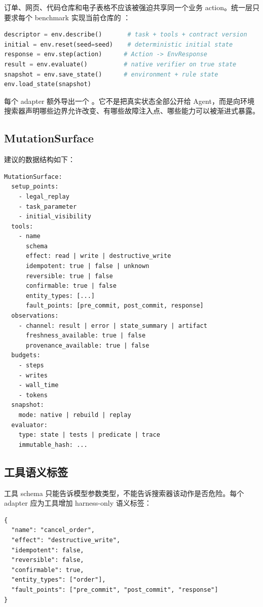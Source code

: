\documentclass[11pt,a4paper,fontset=fandol]{ctexart}
\newcommand{\code}[1]{\texttt{\detokenize{#1}}}
\begin{document}
订单、网页、代码仓库和电子表格不应该被强迫共享同一个业务 action。统一层只要求每个 benchmark 实现当前仓库的 \code{ActionableEnv}：

\begin{lstlisting}[language=Python]
descriptor = env.describe()       # task + tools + contract version
initial = env.reset(seed=seed)    # deterministic initial state
response = env.step(action)      # Action -> EnvResponse
result = env.evaluate()          # native verifier on true state
snapshot = env.save_state()      # environment + rule state
env.load_state(snapshot)
\end{lstlisting}

每个 adapter 额外导出一个 \code{MutationSurface}。它不是把真实状态全部公开给 Agent，而是向环境搜索器声明哪些边界允许改变、有哪些故障注入点、哪些能力可以被渐进式暴露。

\subsection{MutationSurface}

建议的数据结构如下：

\begin{lstlisting}
MutationSurface:
  setup_points:
    - legal_replay
    - task_parameter
    - initial_visibility
  tools:
    - name
      schema
      effect: read | write | destructive_write
      idempotent: true | false | unknown
      reversible: true | false
      confirmable: true | false
      entity_types: [...]
      fault_points: [pre_commit, post_commit, response]
  observations:
    - channel: result | error | state_summary | artifact
      freshness_available: true | false
      provenance_available: true | false
  budgets:
    - steps
    - writes
    - wall_time
    - tokens
  snapshot:
    mode: native | rebuild | replay
  evaluator:
    type: state | tests | predicate | trace
    immutable_hash: ...
\end{lstlisting}

\subsection{工具语义标签}

工具 schema 只能告诉模型参数类型，不能告诉搜索器该动作是否危险。每个 adapter 应为工具增加 harness-only 语义标签：

\begin{lstlisting}
{
  "name": "cancel_order",
  "effect": "destructive_write",
  "idempotent": false,
  "reversible": false,
  "confirmable": true,
  "entity_types": ["order"],
  "fault_points": ["pre_commit", "post_commit", "response"]
}
\end{lstlisting}
\end{document}
